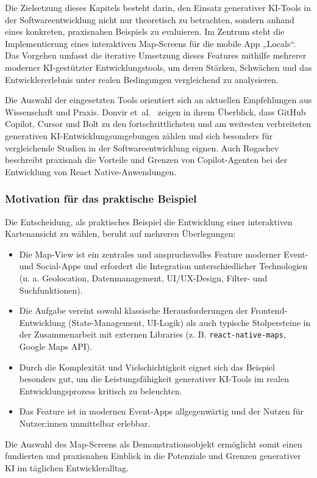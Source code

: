 Die Zielsetzung dieses Kapitels besteht darin, den Einsatz generativer KI-Tools
in der Softwareentwicklung nicht nur theoretisch zu betrachten, sondern anhand
eines konkreten, praxisnahen Beispiels zu evaluieren. Im Zentrum steht die
Implementierung eines interaktiven Map-Screens für die mobile App „Locals“. Das
Vorgehen umfasst die iterative Umsetzung dieses Features mithilfe mehrerer
moderner KI-gestützter Entwicklungstools, um deren Stärken, Schwächen und das
Entwicklererlebnis unter realen Bedingungen vergleichend zu analysieren.

Die Auswahl der eingesetzten Tools orientiert sich an aktuellen Empfehlungen
aus Wissenschaft und Praxis. Donvir et~al.~\cite{donvir_role_2024} zeigen in
ihrem Überblick, dass GitHub Copilot, Cursor und Bolt zu den
fortschrittlichsten und am weitesten verbreiteten generativen
KI-Entwicklungsumgebungen zählen und sich besonders für vergleichende Studien
in der Softwareentwicklung eignen. Auch Rogachev~\cite{rogachev_my_nodate}
beschreibt praxisnah die Vorteile und Grenzen von Copilot-Agenten bei der
Entwicklung von React Native-Anwendungen.

\subsubsection{Motivation für das praktische Beispiel}

Die Entscheidung, als praktisches Beispiel die Entwicklung einer interaktiven
Kartenansicht zu wählen, beruht auf mehreren Überlegungen:
\begin{itemize}
      \item Die Map-View ist ein zentrales und anspruchsvolles Feature moderner Event- und
            Social-Apps und erfordert die Integration unterschiedlicher Technologien (u. a.
            Geolocation, Datenmanagement, UI/UX-Design, Filter- und Suchfunktionen).
      \item Die Aufgabe vereint sowohl klassische Herausforderungen der
            Frontend-Entwicklung (State-Management, UI-Logik) als auch typische
            Stolpersteine in der Zusammenarbeit mit externen Libraries (z. B.
            \texttt{react-native-maps}, Google Maps API).
      \item Durch die Komplexität und Vielschichtigkeit eignet sich das Beispiel besonders
            gut, um die Leistungsfähigkeit generativer KI-Tools im realen
            Entwicklungsprozess kritisch zu beleuchten.
      \item Das Feature ist in modernen Event-Apps allgegenwärtig und der Nutzen für
            Nutzer:innen unmittelbar erlebbar.
\end{itemize}
Die Auswahl des Map-Screens als Demonstrationsobjekt ermöglicht somit einen fundierten und praxisnahen Einblick in die Potenziale und Grenzen generativer KI im täglichen Entwickleralltag.

